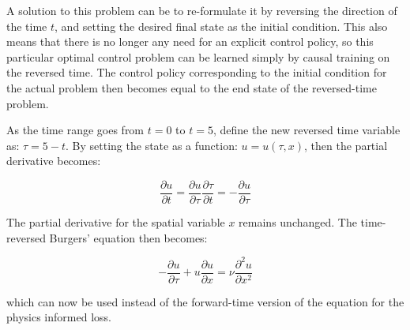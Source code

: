 A solution to this problem can be to re-formulate it by reversing the direction of the time $t$, and setting the desired final state as the initial condition. This also means that there is no longer any need for an explicit control policy, so this particular optimal control problem can be learned simply by causal training on the reversed time. The control policy corresponding to the initial condition for the actual problem then becomes equal to the end state of the reversed-time problem.

As the time range goes from $t = 0$ to $t = 5$, define the new reversed time variable as: $\tau = 5 - t$. By setting the state as a function: $u = u(\tau, x)$, then the partial derivative becomes:

\begin{equation}
    \frac{\partial u}{\partial t} = \frac{\partial u}{\partial \tau} \frac{\partial \tau}{\partial t} = - \frac{\partial u}{\partial \tau}
\end{equation}

The partial derivative for the spatial variable $x$ remains unchanged. The time-reversed Burgers' equation then becomes:

\begin{equation}
    - \frac{\partial u}{\partial \tau} + u \frac{\partial u}{\partial x} = \nu \frac{\partial^2 u}{\partial x^2}
\end{equation}

\noindent which can now be used instead of the forward-time version of the equation for the physics informed loss.


